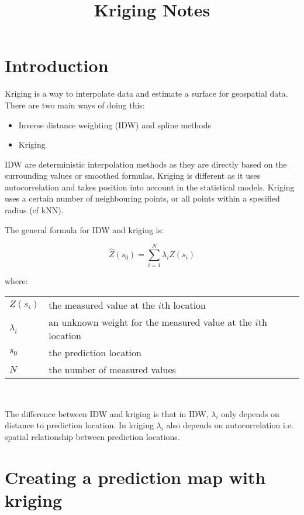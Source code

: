 \documentclass{article}
\title{Kriging Notes}
\makeatletter
\newenvironment{conditions}[1][where:] 
  {#1 \begin{tabular}[t]{>{$}l<{$} @{${}={}$} l}}
  {\end{tabular}\\[\belowdisplayskip]}
\makeatother
\begin{document}
\maketitle

\section{Introduction}

\begin{center}
\end{center}

Kriging is a way to interpolate data and estimate a surface for geospatial data.
There are two main ways of doing this:

\begin{itemize}
    \item Inverse distance weighting (IDW) and spline methods
    \item Kriging
\end{itemize}

IDW are deterministic interpolation methods as they are directly based on the surrounding values or smoothed formulas.
Kriging is different as it uses autocorrelation and takes position into account in the statistical models.
Kriging uses a certain number of neighbouring points, or all points within a specified radius (cf kNN).

The general formula for IDW and kriging is:

\[\hat{Z}\left(s_{0} \right)=\sum_{i=1}^{N}\lambda_{i} Z \left(s_{i}\right)\]

\begin{conditions}
Z \left(s_{i}\right) & the measured value at the $i$th location \\
\lambda_{i} & an unknown weight for the measured value at the $i$th location \\
s_{0} & the prediction location \\
N & the number of measured values
\end{conditions}

The difference between IDW and kriging is that in IDW, $\lambda_{i}$ only depends on distance to prediction location.
In kriging $\lambda_{i}$ also depends on autocorrelation i.e. spatial relationship between prediction locations.

\section{Creating a prediction map with kriging}
\end{document}
